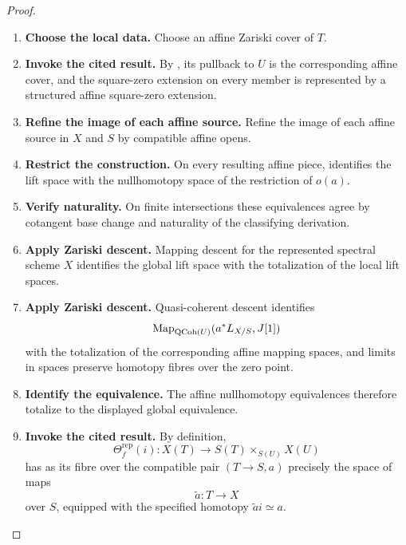 \begin{proof}
\leavevmode
\begin{enumerate}[label=\textup{(\arabic*)}]
    \item \textbf{Choose the local data.}
    Choose an affine Zariski cover of \(T\).

    \item \textbf{Invoke the cited result.}
    By , its pullback to \(U\) is the
    corresponding affine cover, and the square-zero extension on every member is represented by
    a structured affine square-zero extension.

    \item \textbf{Refine the image of each affine source.}
    Refine the image of each affine source in \(X\) and \(S\) by compatible affine
    opens.

    \item \textbf{Restrict the construction.}
    On every resulting affine piece,  identifies the
    lift space with the nullhomotopy space of the restriction of \(o(a)\).

    \item \textbf{Verify naturality.}
    On finite intersections these equivalences agree by cotangent base change and naturality of
    the classifying derivation.

    \item \textbf{Apply Zariski descent.}
    Mapping descent for the represented spectral scheme \(X\) identifies the global lift
    space with the totalization of the local lift spaces.

    \item \textbf{Apply Zariski descent.}
    Quasi-coherent descent identifies
    \[
        \operatorname{Map}_{\operatorname{QCoh}(U)}(a^*L_{X/S},J[1])
    \]
    with the totalization of the corresponding affine mapping spaces, and limits in spaces
    preserve homotopy fibres over the zero point.

    \item \textbf{Identify the equivalence.}
    The affine nullhomotopy equivalences therefore totalize to the displayed global equivalence.

    \item \textbf{Invoke the cited result.}
    By definition,
    \[
        \Theta_f^{\mathrm{rep}}(i):
        X(T)\longrightarrow S(T)\times_{S(U)}X(U)
    \]
    has as its fibre over the compatible pair \((T\to S,a)\) precisely the space of maps
    \[
        \widetilde a:T\longrightarrow X
    \]
    over \(S\), equipped with the specified homotopy \(\widetilde a i\simeq a\).


\end{enumerate}
\end{proof}
